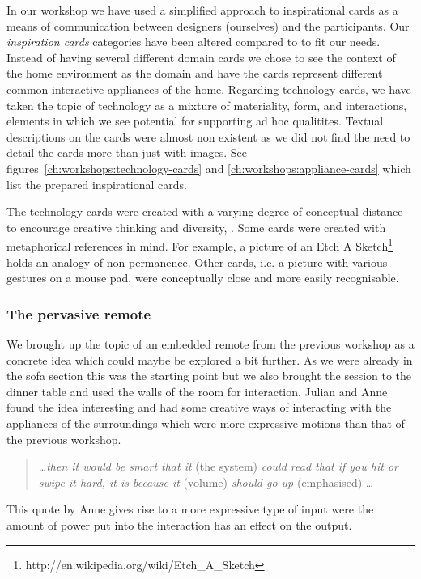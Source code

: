 In our workshop we have used a simplified approach to inspirational cards as a means of communication between designers (ourselves) and the participants.
Our \emph{inspiration cards} categories have been altered compared to \citep{halskov2006inspiration} to fit our needs.
Instead of having several different domain cards we chose to see the context of the home environment as the domain and have the cards represent different common interactive appliances of the home.
Regarding technology cards, we have taken the topic of technology as a mixture of materiality, form, and interactions, elements in which we see potential for supporting ad hoc qualitites.
Textual descriptions on the cards were almost non existent as we did not find the need to detail the cards more than just with images.
See figures~\ref{ch:workshops:technology-cards} and \ref{ch:workshops:appliance-cards} which list the prepared inspirational cards.

The technology cards were created with a varying degree of conceptual distance to encourage creative thinking and diversity, \citep[chap. 10]{benyon2005designing}.
Some cards were created with metaphorical references in mind.
For example, a picture of an Etch A Sketch\footnote{http://en.wikipedia.org/wiki/Etch\_A\_Sketch} holds an analogy of non-permanence.
Other cards, i.e. a picture with various gestures on a mouse pad, were conceptually close and more easily recognisable.

\subsubsection{The pervasive remote}

We brought up the topic of an embedded remote from the previous workshop as a concrete idea which could maybe be explored a bit further.
As we were already in the sofa section this was the starting point but we also brought the session to the dinner table and used the walls of the room for interaction.
Julian and Anne found the idea interesting and had some creative ways of interacting with the appliances of the surroundings which were more expressive motions than that of the previous workshop.

\begin{quotation}
\dots \emph{then it would be smart that it} (the system) \emph{could read that if you hit or swipe it hard, it is because it} (volume) \emph{should go up} (emphasised) \dots
\end{quotation}

This quote by Anne gives rise to a more expressive type of input were the amount of power put into the interaction has an effect on the output.

